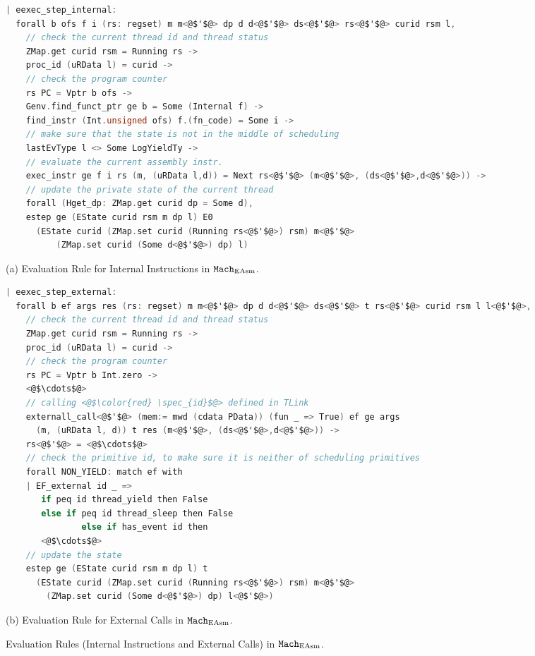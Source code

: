%


\begin{figure}
\begin{lstlisting}[language=C, deletekeywords={unsigned}]
| eexec_step_internal:
  forall b ofs f i (rs: regset) m m<@$'$@> dp d d<@$'$@> ds<@$'$@> rs<@$'$@> curid rsm l,
    // check the current thread id and thread status
    ZMap.get curid rsm = Running rs ->
    proc_id (uRData l) = curid ->
    // check the program counter
    rs PC = Vptr b ofs ->
    Genv.find_funct_ptr ge b = Some (Internal f) ->
    find_instr (Int.unsigned ofs) f.(fn_code) = Some i ->
    // make sure that the state is not in the middle of scheduling
    lastEvType l <> Some LogYieldTy ->
    // evaluate the current assembly instr.
    exec_instr ge f i rs (m, (uRData l,d)) = Next rs<@$'$@> (m<@$'$@>, (ds<@$'$@>,d<@$'$@>)) ->
    // update the private state of the current thread
    forall (Hget_dp: ZMap.get curid dp = Some d),
    estep ge (EState curid rsm m dp l) E0
      (EState curid (ZMap.set curid (Running rs<@$'$@>) rsm) m<@$'$@> 
          (ZMap.set curid (Some d<@$'$@>) dp) l)
\end{lstlisting}
\begin{center}
(a) Evaluation Rule for Internal Instructions in ${\mathrm{\texttt{Mach}}}_{\mathrm{EAsm}}$.
\end{center}
\begin{lstlisting}[language=C]
| eexec_step_external:
  forall b ef args res (rs: regset) m m<@$'$@> dp d d<@$'$@> ds<@$'$@> t rs<@$'$@> curid rsm l l<@$'$@>,
    // check the current thread id and thread status  
    ZMap.get curid rsm = Running rs ->
    proc_id (uRData l) = curid ->
    // check the program counter
    rs PC = Vptr b Int.zero ->
    <@$\cdots$@>
    // calling <@$\color{red} \spec_{id}$@> defined in TLink
    externall_call<@$'$@> (mem:= mwd (cdata PData)) (fun _ => True) ef ge args 
      (m, (uRData l, d)) t res (m<@$'$@>, (ds<@$'$@>,d<@$'$@>)) ->
    rs<@$'$@> = <@$\cdots$@>
    // check the primitive id, to make sure it is neither of scheduling primitives
    forall NON_YIELD: match ef with
    | EF_external id _ => 
       if peq id thread_yield then False
       else if peq id thread_sleep then False
               else if has_event id then
       <@$\cdots$@>
    // update the state
    estep ge (EState curid rsm m dp l) t 
      (EState curid (ZMap.set curid (Running rs<@$'$@>) rsm) m<@$'$@> 
        (ZMap.set curid (Some d<@$'$@>) dp) l<@$'$@>)
\end{lstlisting}
\begin{center}
(b) Evaluation Rule for External Calls in ${\mathrm{\texttt{Mach}}}_{\mathrm{EAsm}}$.
\end{center}
\caption{Evaluation Rules (Internal Instructions and External Calls) in ${\mathrm{\texttt{Mach}}}_{\mathrm{EAsm}}$.}
\label{fig:chapter:linking:eval-rule-in-easm-normal}
\end{figure}

